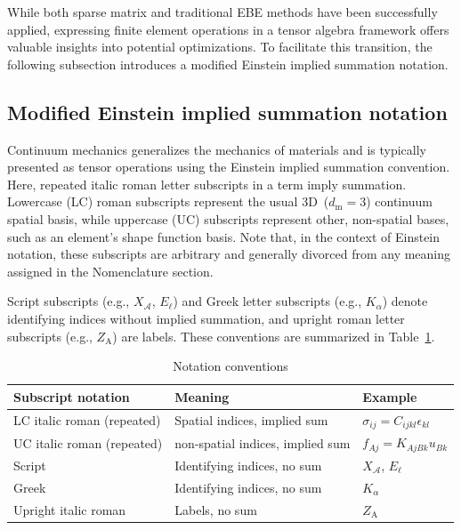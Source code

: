 \documentclass[]             %
{NASA}                       %
\begin{document}
While both sparse matrix and traditional EBE methods have been successfully applied, expressing finite element operations in a tensor algebra framework offers valuable insights into potential optimizations. To facilitate this transition, the following subsection introduces a modified Einstein implied summation notation.

\subsection{Modified Einstein implied summation notation}
\label{subsec:einstein-notation}

Continuum mechanics generalizes the mechanics of materials and is typically
 presented as tensor operations using the Einstein implied summation convention.\cite{ref:einstein-1922-general}
 Here, repeated italic roman letter subscripts in a term imply summation.
 Lowercase (LC) roman subscripts represent
 the usual 3D~($d_{\mathrm{m}}=3$) continuum spatial basis,
 while uppercase (UC) subscripts represent
 other, non-spatial bases, such as an element's shape function basis.
 Note that, in the context of Einstein notation, these subscripts are arbitrary
 and generally divorced from any meaning assigned in the Nomenclature section.
 
 Script subscripts (e.g., $X_{\mathcal{A}}$, $E_{\ell}$) and 
 Greek letter subscripts (e.g., $K_{\alpha}$) 
 denote identifying indices without implied summation, and upright roman
 letter subscripts (e.g., $Z_{\mathrm{A}}$) are labels. These conventions are summarized in Table~\ref{tab:subscript-notation}.

\begin{table}[ht]
\caption{Notation conventions}
\label{tab:subscript-notation}
\begin{center}
\begin{tabular}{lll}
\toprule
 {Subscript notation} & {Meaning} & {Example} \\
\midrule
 LC italic roman (repeated) & Spatial indices, implied sum & $\sigma_{ij} = C_{ijkl} \epsilon_{kl}$ \\
 UC italic roman (repeated) & non-spatial indices, implied sum & $f_{Aj} = K_{AjBk} u_{Bk}$ \\
 Script & Identifying indices, no sum & $X_{\mathcal{A}}$, $E_{\ell}$ \\
 Greek & Identifying indices, no sum & $K_{\alpha}$ \\
 Upright italic roman & Labels, no sum & $Z_{\mathrm{A}}$ \\
\bottomrule
\end{tabular}
\end{center}
\end{table}
\end{document}
